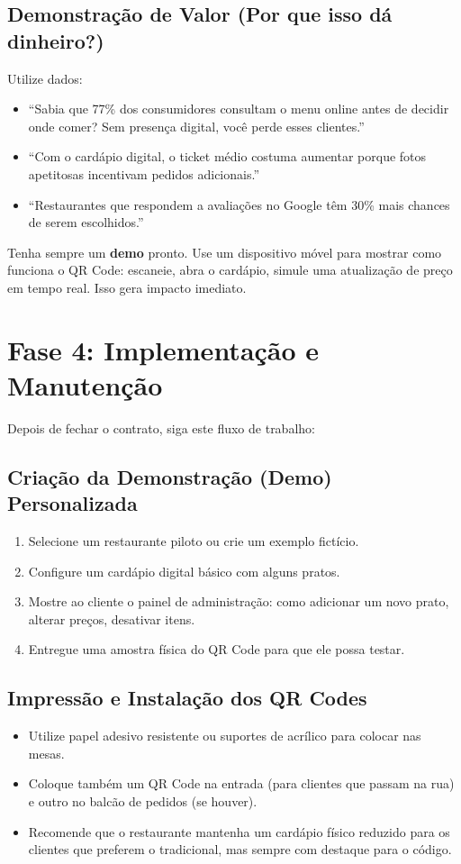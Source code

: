 \documentclass[a4paper,12pt]{article}
\begin{document}
\subsection{Demonstração de Valor (Por que isso dá dinheiro?)}
Utilize dados:
\begin{itemize}
    \item “Sabia que 77\% dos consumidores consultam o menu online antes de decidir onde comer? Sem presença digital, você perde esses clientes.”
    \item “Com o cardápio digital, o ticket médio costuma aumentar porque fotos apetitosas incentivam pedidos adicionais.”
    \item “Restaurantes que respondem a avaliações no Google têm 30\% mais chances de serem escolhidos.”
\end{itemize}

\begin{dica}
    Tenha sempre um \textbf{demo} pronto. Use um dispositivo móvel para mostrar como funciona o QR Code: escaneie, abra o cardápio, simule uma atualização de preço em tempo real. Isso gera impacto imediato.
\end{dica}

\section{Fase 4: Implementação e Manutenção}
Depois de fechar o contrato, siga este fluxo de trabalho:

\subsection{Criação da Demonstração (Demo) Personalizada}
\begin{enumerate}
    \item Selecione um restaurante piloto ou crie um exemplo fictício.
    \item Configure um cardápio digital básico com alguns pratos.
    \item Mostre ao cliente o painel de administração: como adicionar um novo prato, alterar preços, desativar itens.
    \item Entregue uma amostra física do QR Code para que ele possa testar.
\end{enumerate}

\subsection{Impressão e Instalação dos QR Codes}
\begin{itemize}
    \item Utilize papel adesivo resistente ou suportes de acrílico para colocar nas mesas.
    \item Coloque também um QR Code na entrada (para clientes que passam na rua) e outro no balcão de pedidos (se houver).
    \item Recomende que o restaurante mantenha um cardápio físico reduzido para os clientes que preferem o tradicional, mas sempre com destaque para o código.
\end{itemize}
\end{document}
